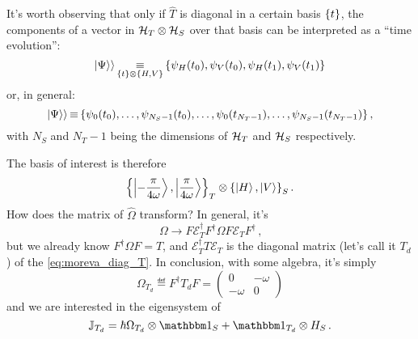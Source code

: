 It's worth observing that
only if $\hat{T}$ is diagonal in a certain basis $\qty{t}$,
the components of a vector in $\mathcal{H}_T \otimes \mathcal{H}_S$
over that basis
can be interpreted as a ``time evolution'':
\begin{equation}
  |\Psi\rangle\rangle
  \operatorname*{\equiv}_{\qty{t} \otimes \qty{H,V}}
  \qty{\psi_H(t_0), \psi_V(t_0), \psi_H(t_1), \psi_V(t_1)}
\end{equation}
or, in general:
\begin{equation}
  |\Psi\rangle\rangle
  \operatorname*{\equiv}
  \qty{
    \psi_0(t_0),
    \dotsc,
    \psi_{N_{S} - 1}(t_0),
    \dots,
    \psi_0(t_{N_{T}-1}),
    \dotsc,
    \psi_{N_{S} - 1}(t_{N_{T}-1})
  } \,\text{,}
\end{equation}
with $N_{S}$ and $N_{T}-1$ being the dimensions of $\mathcal{H}_T$ and $\mathcal{H}_S$ respectively.

The basis of interest is therefore
\begin{equation}
  \qty{\ket{-\frac{\pi}{4\omega}}, \ket{\frac{\pi}{4\omega}}}_T \otimes \qty{\ket{H}, \ket{V}}_S
  \, \text{.}
\end{equation}
How does the matrix of $\hat{\Omega}$ transform? In general, it's
\begin{equation}
  \Omega \rightarrow F \mathcal{E}_T^{\dagger} F^{\dagger} \Omega F \mathcal{E}_T F^{\dagger}
  \, \text{,}
\end{equation}
but we already know $F^{\dagger} \Omega F = T$,
and $\mathcal{E}_T^{\dagger} T \mathcal{E}_T$ is the diagonal matrix
(let's call it $T_d$) of the \eqref{eq:moreva_diag_T}.
In conclusion, with some algebra, it's simply
\begin{equation}
  \Omega_{T_d} \eqdef F^{\dagger} T_d F = \left(\begin{matrix}0 & - \omega\\- \omega & 0\end{matrix}\right)
\end{equation}
and we are interested in the eigensystem of
\begin{equation}
  \mathbb{J}_{T_d} = \hbar \Omega_{T_d} \ox \idop_{S} + \idop_{T_d} \ox H_S
  \, \text{.}
\end{equation}